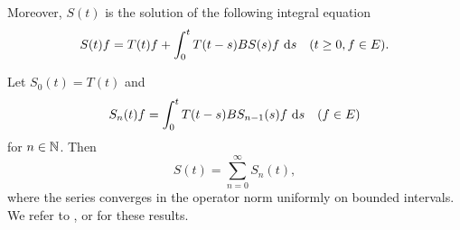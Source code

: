 Moreover, $S(t)$ is the solution of the following integral equation
\begin{equation}\label{eq:a2-1.9}
    S(t)f = T(t)f + \int_{0}^{t} T(t-s)BS(s)f\, \ds \quad (t \geq 0, f \in E).
\end{equation}

Let $S_{0}(t) = T(t)$ and
\begin{equation}\label{eq:a2-1.10}
    S_{n}(t)f = \int_{0}^{t} T(t-s)BS_{n-1}(s)f\, \mathop{}\!\mathrm{d}{s} \quad (f \in E)
\end{equation}
for $n \in \mathbb{N}$. Then
\begin{equation}\label{eq:a2-1.11}
    S(t) = \sum_{n=0}^{\infty} S_{n}(t),
\end{equation}
where the series converges in the operator norm uniformly on bounded intervals.
We refer to \textcite[III.1]{davies:1980}, \textcite[I.6]{goldstein:1985a} or \textcite[Chapter 3]{pazy:1983} for these results.

